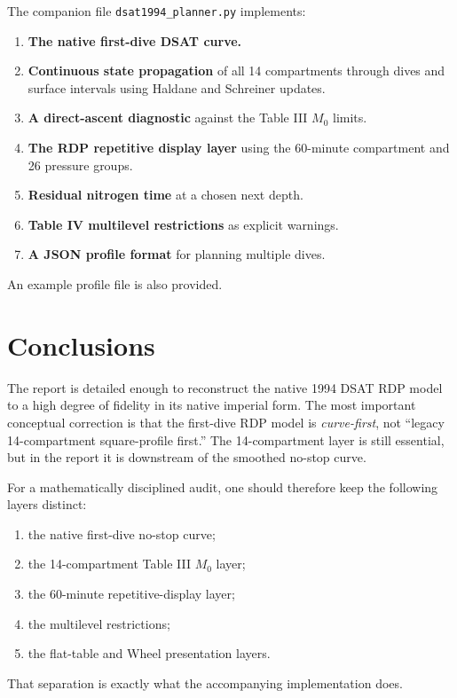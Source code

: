 \documentclass[11pt]{article}
\begin{document}
The companion file \texttt{dsat1994\_planner.py} implements:
\begin{enumerate}[label=\arabic*.]
\item \textbf{The native first-dive DSAT curve.}
\item \textbf{Continuous state propagation} of all 14 compartments through dives and surface intervals using Haldane and Schreiner updates.
\item \textbf{A direct-ascent diagnostic} against the Table III $M_0$ limits.
\item \textbf{The RDP repetitive display layer} using the 60-minute compartment and 26 pressure groups.
\item \textbf{Residual nitrogen time} at a chosen next depth.
\item \textbf{Table IV multilevel restrictions} as explicit warnings.
\item \textbf{A JSON profile format} for planning multiple dives.
\end{enumerate}

An example profile file is also provided.

\section{Conclusions}

The report is detailed enough to reconstruct the native 1994 DSAT RDP model to a high degree of fidelity in its native imperial form. The most important conceptual correction is that the first-dive RDP model is \emph{curve-first}, not ``legacy 14-compartment square-profile first.'' The 14-compartment layer is still essential, but in the report it is downstream of the smoothed no-stop curve.

For a mathematically disciplined audit, one should therefore keep the following layers distinct:
\begin{enumerate}[label=\arabic*.]
\item the native first-dive no-stop curve;
\item the 14-compartment Table III $M_0$ layer;
\item the 60-minute repetitive-display layer;
\item the multilevel restrictions;
\item the flat-table and Wheel presentation layers.
\end{enumerate}

That separation is exactly what the accompanying implementation does.
\end{document}
